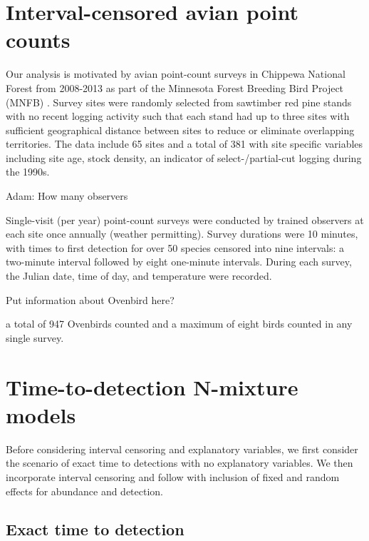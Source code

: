 \documentclass[useAMS,usenatbib,referee,12pt]{article}
\newcommand{\jarad}[1]{{\color{Orange} #1}}
\begin{document}
\section{Interval-censored avian point counts}\label{sec:data}

Our analysis is motivated by avian point-count surveys in Chippewa National Forest from 2008-2013 as part of the Minnesota Forest Breeding Bird Project (MNFB) \citet{Hanowski1995}.  
Survey sites were randomly selected from sawtimber red pine stands with no recent logging activity such that each stand had up to three sites with sufficient geographical distance between sites to reduce or eliminate overlapping territories.
The data include 65 sites and a total of 381 with site specific variables including site age,  stock density, an indicator of select-/partial-cut logging during the 1990s. 





\jarad{Adam: How many observers}

Single-visit (per year) point-count surveys were conducted by trained observers at each site once annually (weather permitting).  
Survey durations were 10 minutes, with times to first detection for over 50 species censored into nine intervals: a two-minute interval followed by eight one-minute intervals.  
During each survey, the Julian date, time of day, and temperature were recorded. 

\jarad{Put information about Ovenbird here?}

a total of 947 Ovenbirds counted and a maximum of eight birds counted in any single survey.






\section{Time-to-detection N-mixture models} \label{sec:model}

Before considering interval censoring and explanatory variables, we first consider the scenario of exact time to detections with no explanatory variables. 
We then incorporate interval censoring and follow with inclusion of fixed and random effects for abundance and detection. 

\subsection{Exact time to detection}
\end{document}
